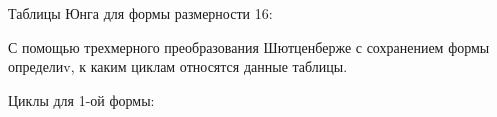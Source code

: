 Таблицы Юнга для формы размерности 16:
\begin{figure}[H]
\end{figure}

С помощью трехмерного преобразования Шютценберже с сохранением формы определиv, к каким циклам относятся данные таблицы.

Циклы для 1-ой формы:
\begin{figure}[H]
\end{figure}

